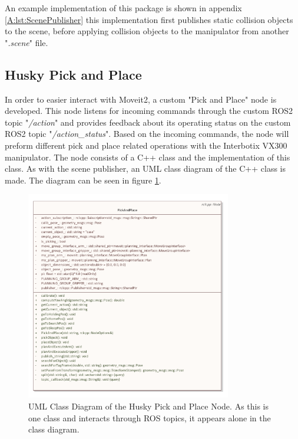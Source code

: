 An example implementation of this package is shown in appendix \ref{A:lst:ScenePublisher} this implementation first publishes static collision objects to the scene, before applying collision objects to the manipulator from another "\textit{.scene}" file. 


\subsection{Husky Pick and Place} \label{sec:M:A:HuskyPickAndPlace}
In order to easier interact with Moveit2, a custom "Pick and Place" node is developed. This node listens for incoming commands through the custom ROS2 topic "\textit{/action}" and provides feedback about its operating status on the custom ROS2 topic "\textit{/action\_status}". Based on the incoming commands, the node will preform different pick and place related operations with the Interbotix VX300 manipulator. The node consists of a C++ class and the implementation of this class. As with the scene publisher, an UML class diagram of the C++ class is made. The diagram can be seen in figure \ref{fig:PickAndPlaceUML}.

\begin{figure}[htp]
  \centering
  \includegraphics[width = 0.8\textwidth]{Figures/husky_pick_and_place.pdf}
  \caption{UML Class Diagram of the Husky Pick and Place Node. As this is one class and interacts through ROS topics, it appears alone in the class diagram.}
  \label{fig:PickAndPlaceUML}
\end{figure}

